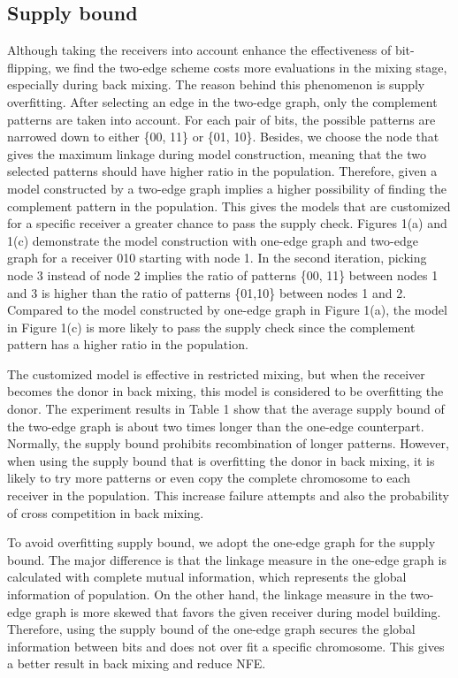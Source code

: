 \documentclass{sig-alternate-05-2015}
\begin{document}
\subsection{Supply bound}
Although taking the receivers into account enhance the effectiveness of bit-flipping, we find the two-edge scheme costs more evaluations in the mixing stage, especially during back mixing. The reason behind this phenomenon is supply overfitting. After selecting an edge in the two-edge graph, only the complement patterns are taken into account. For each pair of bits, the possible patterns are narrowed down to either \{00, 11\} or \{01, 10\}. Besides, we choose the node that gives the maximum linkage during model construction, meaning that the two selected patterns should have higher ratio in the population. Therefore, given a model constructed by a two-edge graph implies a higher possibility of finding the complement pattern in the population. This gives the models that are customized for a specific receiver a greater chance to pass the supply check. Figures 1(a) and 1(c) demonstrate the model construction with one-edge graph and two-edge graph for a receiver 010 starting with node 1. In the second iteration, picking node 3 instead of node 2 implies the ratio of patterns \{00, 11\} between nodes 1 and 3 is higher than the ratio of patterns \{01,10\} between nodes 1 and 2. Compared to the model constructed by one-edge graph in Figure 1(a), the model in Figure 1(c) is more likely to pass the supply check since the complement pattern has a higher ratio in the population. 

The customized model is effective in restricted mixing, but when the receiver becomes the donor in back mixing, this model is considered to be overfitting the donor. The experiment results in Table 1 show that the average supply bound of the two-edge graph is about two times longer than the one-edge counterpart. Normally, the supply bound prohibits recombination of longer patterns. However, when using the supply bound that is overfitting the donor in back mixing, it is likely to try more patterns or even copy the complete chromosome to each receiver in the population. This increase failure attempts and also the probability of cross competition in back mixing. 

To avoid overfitting supply bound, we adopt the one-edge graph for the supply bound. The major difference is that the linkage measure in the one-edge graph is calculated with complete mutual information, which represents the global information of population. On the other hand, the linkage measure in the two-edge graph is more skewed that favors the given receiver during model building. Therefore, using the supply bound of the one-edge graph secures the global information between bits and does not over fit a specific chromosome. This gives a better result in back mixing and reduce NFE.
\end{document}

